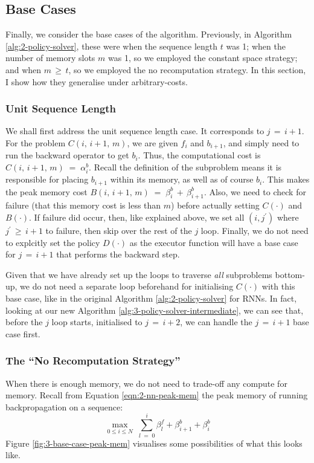 \subsection{Base Cases}
Finally, we consider the base cases of the algorithm.
Previously, in Algorithm \ref{alg:2-policy-solver}, these were when the sequence length \(t\) was 1;
when the number of memory slots \(m\) was 1, so we employed the constant space strategy;
and when \(m \,\geq\, t\), so we employed the no recomputation strategy.
In this section, I show how they generalise under arbitrary-costs.

\subsubsection*{Unit Sequence Length}
We shall first address the unit sequence length case.
It corresponds to \(j \,=\, i+1\).
For the problem \(C(i,\,i+1,\,m)\), we are given \(f_i\) and \(b_{i+1}\), and simply need to run the backward operator to get \(b_i\).
Thus, the computational cost is \(C(i,\,i+1,\,m) \;=\; \alpha^b_i\).
Recall the definition of the subproblem means it is responsible for placing \(b_{i+1}\) within its memory, as well as of course \(b_{i}\).
This makes the peak memory cost \(B(i,\,i+1,\,m) \;=\; \beta^b_i \,+\, \beta^b_{i+1}\).
Also, we need to check for failure (that this memory cost is less than \(m\)) before actually setting \(C(\cdot)\) and \(B(\cdot)\).
If failure did occur, then, like explained above, we set all \((i, j^\prime)\) where \(j^\prime \,\geq\, i+1\) to failure, then skip over the rest of the \(j\) loop.
Finally, we do not need to explcitly set the policy \(D(\cdot)\) as the executor function will have a base case for \(j \,=\, i+1\) that performs the backward step.

Given that we have already set up the loops to traverse \textit{all} subproblems bottom-up, we do not need a separate loop beforehand for initialising \(C(\cdot)\) with this base case, like in the original Algorithm \ref{alg:2-policy-solver} for RNNs.
In fact, looking at our new Algorithm \ref{alg:3-policy-solver-intermediate}, we can see that, before the \(j\) loop starts, initialised to \(j\,=\,i+2\), we can handle the \(j\,=\,i+1\) base case first.

\subsubsection*{The ``No Recomputation Strategy''}
When there is enough memory, we do not need to trade-off any compute for memory.
Recall from Equation \ref{eqn:2-nn-peak-mem} the peak memory of running backpropagation on a sequence:
\begin{equation*}
    \max_{0 \leq i \leq N}\; \sum_{l\;=\;0}^i \beta^f_l + \beta^b_{i+1} + \beta^b_i
\end{equation*}
Figure \ref{fig:3-base-case-peak-mem} visualises some possibilities of what this looks like.

